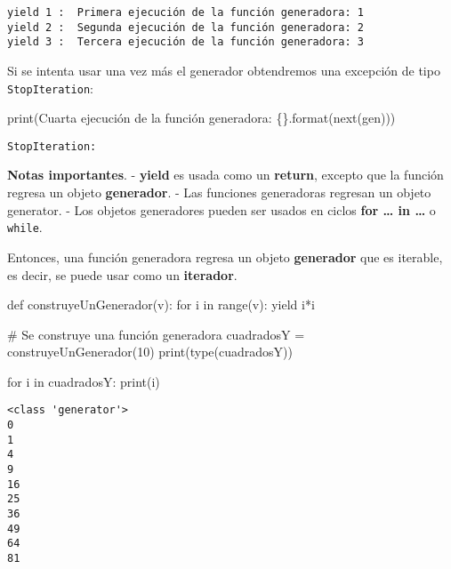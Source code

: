 \documentclass[
  letterpaper,
  DIV=11,
  numbers=noendperiod]{scrreprt}
\newenvironment{Shaded}{\begin{snugshade}}{\end{snugshade}}
\newcommand{\BuiltInTok}[1]{\textcolor[rgb]{0.00,0.23,0.31}{#1}}
\newcommand{\CommentTok}[1]{\textcolor[rgb]{0.37,0.37,0.37}{#1}}
\newcommand{\ControlFlowTok}[1]{\textcolor[rgb]{0.00,0.23,0.31}{#1}}
\newcommand{\DecValTok}[1]{\textcolor[rgb]{0.68,0.00,0.00}{#1}}
\newcommand{\KeywordTok}[1]{\textcolor[rgb]{0.00,0.23,0.31}{#1}}
\newcommand{\NormalTok}[1]{\textcolor[rgb]{0.00,0.23,0.31}{#1}}
\newcommand{\OperatorTok}[1]{\textcolor[rgb]{0.37,0.37,0.37}{#1}}
\newcommand{\SpecialCharTok}[1]{\textcolor[rgb]{0.37,0.37,0.37}{#1}}
\newcommand{\StringTok}[1]{\textcolor[rgb]{0.13,0.47,0.30}{#1}}
\begin{document}
\begin{verbatim}
yield 1 :  Primera ejecución de la función generadora: 1
yield 2 :  Segunda ejecución de la función generadora: 2
yield 3 :  Tercera ejecución de la función generadora: 3
\end{verbatim}

Si se intenta usar una vez más el generador obtendremos una excepción de
tipo \texttt{StopIteration}:

\begin{Shaded}
\begin{Highlighting}[]
\BuiltInTok{print}\NormalTok{(}\StringTok{\textquotesingle{}Cuarta ejecución de la función generadora: }\SpecialCharTok{\{\}}\StringTok{\textquotesingle{}}\NormalTok{.}\BuiltInTok{format}\NormalTok{(}\BuiltInTok{next}\NormalTok{(gen)))}
\end{Highlighting}
\end{Shaded}

\begin{verbatim}
StopIteration: 
\end{verbatim}

\textbf{Notas importantes}. - \textbf{yield} es usada como un
\textbf{return}, excepto que la función regresa un objeto
\textbf{generador}. - Las funciones generadoras regresan un objeto
generator. - Los objetos generadores pueden ser usados en ciclos
\textbf{for \ldots{} in \ldots{}} o \texttt{while}.

Entonces, una función generadora regresa un objeto \textbf{generador}
que es iterable, es decir, se puede usar como un \textbf{iterador}.

\begin{Shaded}
\begin{Highlighting}[]
\KeywordTok{def}\NormalTok{ construyeUnGenerador(v):}
    \ControlFlowTok{for}\NormalTok{ i }\KeywordTok{in} \BuiltInTok{range}\NormalTok{(v):       }
        \ControlFlowTok{yield}\NormalTok{ i}\OperatorTok{*}\NormalTok{i           }

\CommentTok{\# Se construye una función generadora}
\NormalTok{cuadradosY }\OperatorTok{=}\NormalTok{ construyeUnGenerador(}\DecValTok{10}\NormalTok{) }
\BuiltInTok{print}\NormalTok{(}\BuiltInTok{type}\NormalTok{(cuadradosY))}

\ControlFlowTok{for}\NormalTok{ i }\KeywordTok{in}\NormalTok{ cuadradosY:}
    \BuiltInTok{print}\NormalTok{(i)}
\end{Highlighting}
\end{Shaded}

\begin{verbatim}
<class 'generator'>
0
1
4
9
16
25
36
49
64
81
\end{verbatim}
\end{document}
